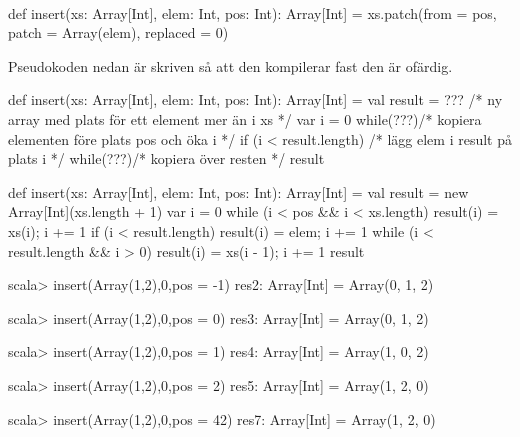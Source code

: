 \SOLUTION

\TaskSolved \what~

\SubtaskSolved

\begin{ConceptConnections}

\end{ConceptConnections}

\SubtaskSolved

\begin{Code}
def insert(xs: Array[Int], elem: Int, pos: Int): Array[Int] =
  xs.patch(from = pos, patch = Array(elem), replaced = 0)
\end{Code}

\SubtaskSolved Pseudokoden nedan är skriven så att den kompilerar fast den är ofärdig.
\begin{Code}
def insert(xs: Array[Int], elem: Int, pos: Int): Array[Int] = {
  val result = ??? /* ny array med plats för ett element mer än i xs */
  var i = 0
  while(???){/* kopiera elementen före plats pos och öka i */}
  if (i < result.length) /* lägg elem i result på plats i */
  while(???){/* kopiera över resten */}
  result
}
\end{Code}

\SubtaskSolved
\begin{Code}
def insert(xs: Array[Int], elem: Int, pos: Int): Array[Int] = {
  val result = new Array[Int](xs.length + 1)
  var i = 0
  while (i < pos && i < xs.length) { result(i) = xs(i); i += 1}
  if (i < result.length) { result(i) = elem; i += 1 }
  while (i < result.length && i > 0) { result(i) = xs(i - 1); i += 1}
  result
}
\end{Code}
\begin{REPL}
scala> insert(Array(1,2),0,pos = -1)
res2: Array[Int] = Array(0, 1, 2)

scala> insert(Array(1,2),0,pos = 0)
res3: Array[Int] = Array(0, 1, 2)

scala> insert(Array(1,2),0,pos = 1)
res4: Array[Int] = Array(1, 0, 2)

scala> insert(Array(1,2),0,pos = 2)
res5: Array[Int] = Array(1, 2, 0)

scala> insert(Array(1,2),0,pos = 42)
res7: Array[Int] = Array(1, 2, 0)
\end{REPL}

\QUESTEND




